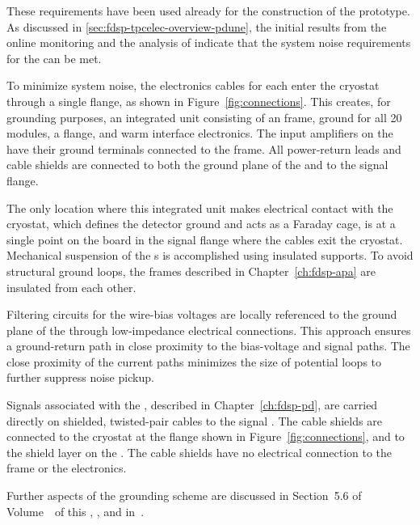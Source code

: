 These requirements have been used already for the construction
of the  prototype. As discussed in \ref{sec:fdsp-tpcelec-overview-pdune},
the initial results from the online monitoring and the
analysis of  indicate that the system
noise requirements for the  
can be met.

To minimize system noise, the  electronics cables for each  
enter the cryostat through a single  flange, as shown in 
Figure~\ref{fig:connections}. This creates, for grounding purposes, 
an integrated unit consisting of an  frame, 
ground for all \num{20}  modules, a  flange, and 
warm interface electronics. The input amplifiers on the 
  have their ground terminals connected to 
the  frame. All power-return leads and cable shields are 
connected to both the ground plane of the  and to the 
 signal flange.

The only location where this integrated unit makes electrical contact 
with the cryostat, which defines the detector ground and acts as a 
Faraday cage, is at a single point on the  \fdth board in 
the  signal flange where the cables exit the cryostat. 
Mechanical suspension of the s is accomplished using 
insulated supports. To avoid structural ground loops, the  
frames described in Chapter~\ref{ch:fdsp-apa} are insulated from 
each other.

Filtering circuits for the  wire-bias voltages are 
locally referenced to the ground plane of the  
through low-impedance electrical connections. This approach 
ensures a ground-return path in close proximity to the 
bias-voltage and signal paths. The close proximity of the 
current paths minimizes the size of potential loops to further 
suppress noise pickup.

Signals associated with the , described in 
Chapter~\ref{ch:fdsp-pd}, are carried directly on shielded, 
twisted-pair cables to the signal \fdth. The cable shields 
are connected to the cryostat at the  flange 
shown in Figure~\ref{fig:connections}, and to the  
shield layer on the . The cable shields have no 
electrical connection to the  frame or the 
electronics.

Further aspects of the  grounding scheme are 
discussed in Section~5.6 of Volume~\volnumbertc\  of this ,
\voltitletc, and in~\cite{DUNE:GroundingRules}.

